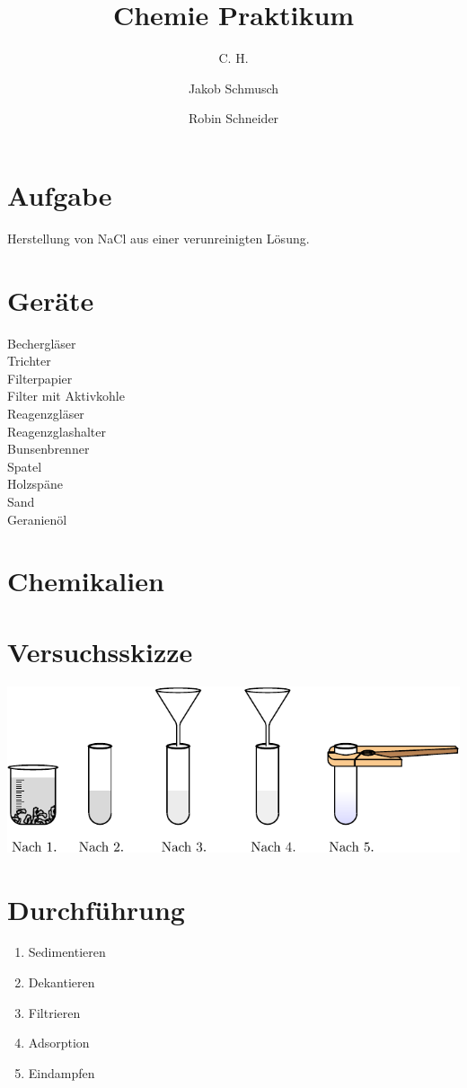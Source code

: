 \documentclass[
  ngerman,
]{scrartcl}
\title{Chemie Praktikum}
\author[*]{C. H.}
\author[*]{Jakob Schmusch}
\author[*]{Robin Schneider}
\begin{document}
\section*{Aufgabe}
Herstellung von NaCl aus einer verunreinigten Lösung.

\vspace{0.1cm}
\begin{multicols}{2}
  \section*{Geräte}
  Bechergläser\\
  Trichter\\
  Filterpapier\\
  Filter mit Aktivkohle\\
  Reagenzgläser\\
  Reagenzglashalter\\
  Bunsenbrenner\\
  Spatel\\
  Holzspäne\\
  Sand\\
  Geranienöl


  \section*{Chemikalien}
\end{multicols}

\section*{Versuchsskizze}
\begin{center}
  \includegraphics[scale=1.3]{pst-labo/Loesung_konzentrieren-pics.pdf}
\end{center}

\vspace{-0.2cm}
\section*{Durchführung}
\begin{enumerate}
  \item Sedimentieren
  \item Dekantieren
  \item Filtrieren
  \item Adsorption
  \item Eindampfen
\end{enumerate}
\end{document}
